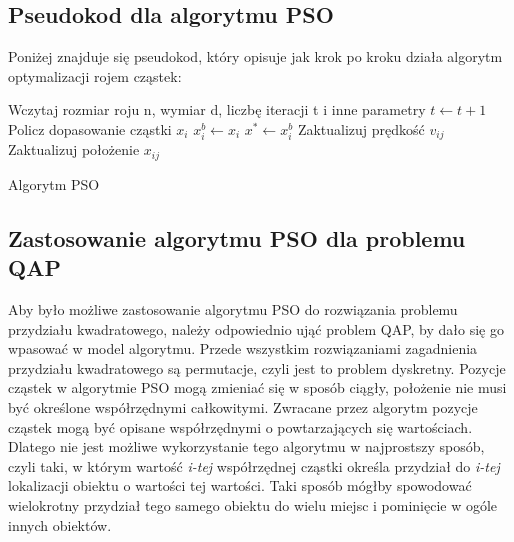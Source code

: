 \subsection{Pseudokod dla algorytmu PSO}
Poniżej znajduje się pseudokod, który opisuje jak krok po kroku działa algorytm optymalizacji rojem cząstek:
\newpage
\begin{algorithm}[h]
	Wczytaj rozmiar roju n, wymiar d, liczbę iteracji t i inne parametry\;
 	{
 		$t\leftarrow t+1$\;
  		{
  			Policz dopasowanie cząstki $x_i$\;
  			{
  				$x_i^b \leftarrow x_i$
  			}
  			{
  				$x^* \leftarrow x_i^b$
  			}
  		}
  		{
  			{
  				Zaktualizuj prędkość $v_{ij}$\;
  				Zaktualizuj położenie $x_{ij}$\;
  			}
  		}
 	}
 	\caption{Algorytm PSO}
\end{algorithm}

\subsection{Zastosowanie algorytmu PSO dla problemu QAP}
Aby było możliwe zastosowanie algorytmu PSO do rozwiązania problemu przydziału kwadratowego, należy odpowiednio ująć problem QAP, by dało się go wpasować w model algorytmu. Przede wszystkim rozwiązaniami zagadnienia przydziału kwadratowego są permutacje, czyli jest to problem dyskretny. Pozycje cząstek w algorytmie PSO mogą zmieniać się w sposób ciągły, położenie nie musi być określone współrzędnymi całkowitymi. Zwracane przez algorytm pozycje cząstek mogą być opisane współrzędnymi o powtarzających się wartościach. Dlatego nie jest możliwe wykorzystanie tego algorytmu w najprostszy sposób, czyli taki, w którym wartość \textit{i-tej} współrzędnej cząstki określa przydział do \textit{i-tej} lokalizacji obiektu o wartości tej wartości. Taki sposób mógłby spowodować wielokrotny przydział tego samego obiektu do wielu miejsc i pominięcie w ogóle innych obiektów.

